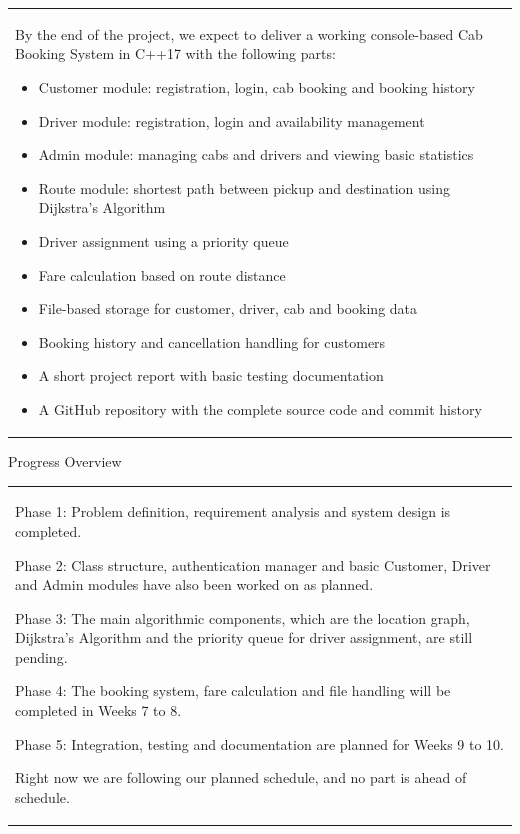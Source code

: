 \documentclass[12pt,a4paper]{article}
\newcommand{\sectiontitle}[1]{%
    {\color{GEUBlue}
    \fontsize{18}{22}\selectfont #1}
}
\newcommand{\answerbox}[2]{%
    \begin{tabularx}{\textwidth}{
        |>{\RaggedRight\arraybackslash}X|}
        \hline
        \parbox[t][#1][t]{\dimexpr\linewidth-12pt\relax}{
            \vspace{5pt}
            \fontsize{11}{13}\selectfont #2
        }\\
        \hline
    \end{tabularx}
}
\begin{document}
\answerbox{7.7cm}{
By the end of the project, we expect to deliver a working console-based Cab Booking System in C++17 with the following parts:

\begin{itemize}
\setlength{\itemsep}{0pt}
\setlength{\topsep}{2pt}
\item Customer module: registration, login, cab booking and booking history
\item Driver module: registration, login and availability management
\item Admin module: managing cabs and drivers and viewing basic statistics
\item Route module: shortest path between pickup and destination using Dijkstra's Algorithm
\item Driver assignment using a priority queue
\item Fare calculation based on route distance
\item File-based storage for customer, driver, cab and booking data
\item Booking history and cancellation handling for customers
\item A short project report with basic testing documentation
\item A GitHub repository with the complete source code and commit history
\end{itemize}
}

\vspace{0.75cm}

\sectiontitle{Progress Overview}

\vspace{0.05cm}

\vspace{0.25cm}

\answerbox{5.00cm}{


Phase 1: Problem definition, requirement analysis and system design is completed.

Phase 2: Class structure, authentication manager and basic Customer, Driver and Admin modules have also been worked on as planned.

Phase 3: The main algorithmic components, which are the location graph, Dijkstra's Algorithm and the priority queue for driver assignment, are still pending.

Phase 4: The booking system, fare calculation and file handling will be completed in Weeks 7 to 8.

Phase 5: Integration, testing and documentation are planned for Weeks 9 to 10.

Right now we are following our planned schedule, and no part is ahead of schedule.

}
\end{document}
